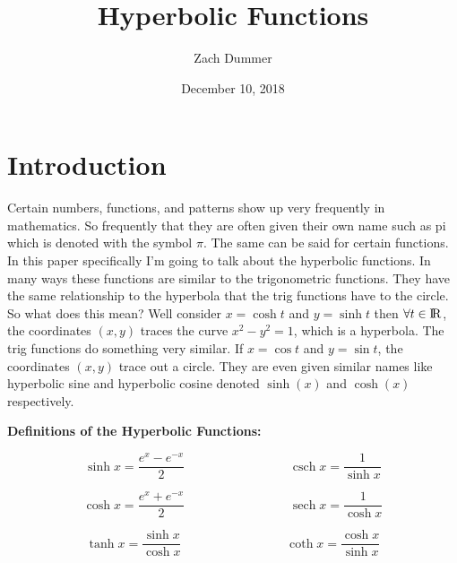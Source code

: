 \documentclass[12pt]{article}
\title{Hyperbolic Functions}
\author{Zach Dummer }
\date{December 10, 2018}
\DeclareMathOperator{\sech}{sech}
\DeclareMathOperator{\csch}{csch}
\begin{document}
\maketitle

\section{Introduction}
Certain numbers, functions, and patterns show up very frequently in mathematics. So frequently that they are often given their own name such as pi which is denoted with the symbol $\pi$. The same can be said for certain functions. In this paper specifically I'm going to talk about the hyperbolic functions. In many ways these functions are similar to the trigonometric functions. They have the same relationship to the hyperbola that the trig functions have to the circle. So what does this mean? Well consider $x = \cosh{t}$ and $y = \sinh{t}$ then $\forall t \in{\rm I\!R}$, the coordinates $(x,y)$ traces the curve $x^2 - y^2 = 1$, which is a hyperbola. The trig functions do something very similar. If $x = \cos{t}$ and $y = \sin{t}$, the coordinates $(x, y)$ trace out a circle. They are even given similar names like hyperbolic sine and hyperbolic cosine denoted $\sinh(x)$ and $\cosh(x)$ respectively.

\begin{center}
{\bf Definitions of the Hyperbolic Functions:}
\end{center}

\[\sinh{x} = \frac{e^x - e^{-x}}{2} \hspace{100pt} \csch{x} = \frac{1}{\sinh{x}}\]

\[\cosh{x} = \frac{e^x + e^{-x}}{2} \hspace{100pt} \sech{x} = \frac{1}{\cosh{x}}\]

\[\tanh{x} = \frac{\sinh{x}}{\cosh{x}} \hspace{100pt} \coth{x} = \frac{\cosh{x}}{\sinh{x}}\]
\end{document}
